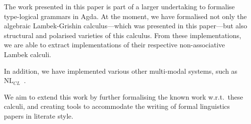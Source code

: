 \documentclass[twocolumn]{llncs}
\begin{document}
The work presented in this paper is part of a larger undertaking to
formalise type-logical grammars in Agda. At the moment, we have
formalised not only the algebraic Lambek-Grishin calculus---which was
presented in this paper---but also structural and polarised varieties
of this calculus. From these implementations, we are able to extract
implementations of their respective non-associative Lambek calculi.

In addition, we have implemented various other multi-modal systems,
such as $\text{NL}_{\textit{CL}}$~\citep{bs2015}.

We aim to extend this work by further formalising the known work
w.r.t.\ these calculi, and creating tools to accommodate the writing
of formal linguistics papers in literate style.

\nocite{*}


\end{document}
